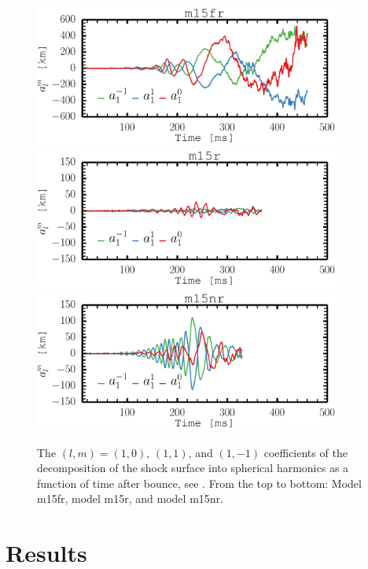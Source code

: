 \begin{figure}[H!]         
\centering                            
\includegraphics[width=0.9\textwidth]{./images/paper2/sasi_fr.pdf}
\includegraphics[width=0.9\textwidth]{./images/paper2/sasi_r.pdf}
\includegraphics[width=0.9\textwidth]{./images/paper2/sasi_nr.pdf}
\caption{The $(l,m) = (1,0)$, $(1,1)$, and $(1,-1)$ coefficients of the decomposition of the shock surface into spherical harmonics
as a function of time after bounce, see . From the top to bottom: Model m15fr, model m15r, and model m15nr. \label{figp2:sasi}}
\end{figure}

\section{Results}
